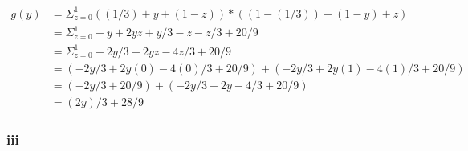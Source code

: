 \documentclass[letterpaper,notitlepage,twoside]{article}
\begin{document}
\begin{align*}
g(y) &= \Sigma_{z = 0}^1 ((1/3) + y + (1 - z)) * ((1 - (1/3)) + (1 - y) + z) \\
     &= \Sigma_{z = 0}^1 -y + 2 y z + y/3 - z - z/3 + 20/9 \\
     &= \Sigma_{z = 0}^1 -2y/3 + 2 y z - 4z/3 + 20/9 \\
     &= (-2y/3 + 2 y (0) - 4(0)/3 + 20/9) + (-2y/3 + 2 y (1) - 4(1)/3 + 20/9) \\
     &= (-2y/3 + 20/9) + (-2y/3 + 2 y - 4/3 + 20/9) \\
     &= (2 y)/3 + 28/9
\end{align*}

\subsubsection*{iii}
\end{document}
